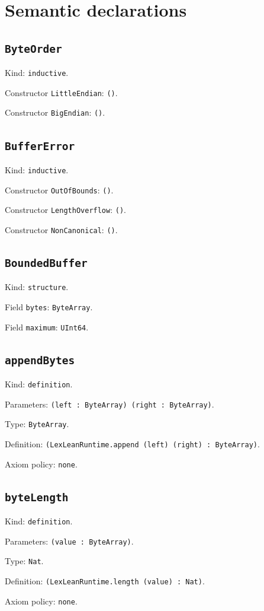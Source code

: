 \documentclass[11pt]{article}
\begin{document}
\section*{Semantic declarations}
\subsection*{\texttt{ByteOrder}}
\noindent Kind: \texttt{inductive}.\par
\noindent Constructor \texttt{LittleEndian}: \texttt{()}.\par
\noindent Constructor \texttt{BigEndian}: \texttt{()}.\par
\subsection*{\texttt{BufferError}}
\noindent Kind: \texttt{inductive}.\par
\noindent Constructor \texttt{OutOfBounds}: \texttt{()}.\par
\noindent Constructor \texttt{LengthOverflow}: \texttt{()}.\par
\noindent Constructor \texttt{NonCanonical}: \texttt{()}.\par
\subsection*{\texttt{BoundedBuffer}}
\noindent Kind: \texttt{structure}.\par
\noindent Field \texttt{bytes}: \texttt{ByteArray}.\par
\noindent Field \texttt{maximum}: \texttt{UInt64}.\par
\subsection*{\texttt{appendBytes}}
\noindent Kind: \texttt{definition}.\par
\noindent Parameters: \texttt{(left : ByteArray) (right : ByteArray)}.\par
\noindent Type: \texttt{ByteArray}.\par
\noindent Definition: \texttt{(LexLeanRuntime.append (left) (right) : ByteArray)}.\par
\noindent Axiom policy: \texttt{none}.\par
\subsection*{\texttt{byteLength}}
\noindent Kind: \texttt{definition}.\par
\noindent Parameters: \texttt{(value : ByteArray)}.\par
\noindent Type: \texttt{Nat}.\par
\noindent Definition: \texttt{(LexLeanRuntime.length (value) : Nat)}.\par
\noindent Axiom policy: \texttt{none}.\par
\end{document}
